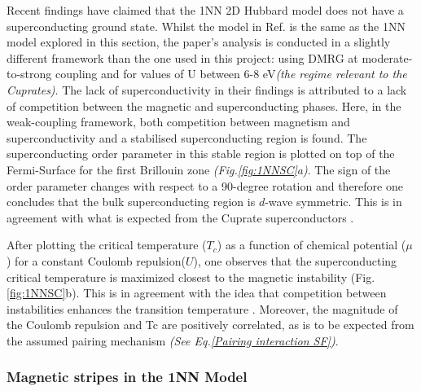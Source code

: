 \documentclass[11pt]{article}
\begin{document}
\noindent Recent findings have claimed that the 1NN 2D Hubbard model does not have a superconducting ground state\cite{qin2020absence}. 
Whilst the model in Ref. \cite{qin2020absence} is the same as the 1NN model explored in this section, the paper's analysis is conducted in a 
slightly different framework than the one used in this project: using DMRG \cite{white1992density} 
at moderate-to-strong coupling and for values of U between 6-8 eV\textit{(the 
regime relevant to the Cuprates)}.
The lack of superconductivity in their findings is attributed to a lack of competition 
between the magnetic and superconducting phases. Here, in the weak-coupling framework, both  competition between magnetism and superconductivity and 
a stabilised superconducting region is found. The superconducting order parameter in this stable region is plotted on top of the Fermi-Surface for the first Brillouin zone \textit{(Fig.\ref{fig:1NNSC}a)}.
The sign of the order parameter changes with respect to a 90-degree rotation and therefore one concludes that
the bulk superconducting region is $d$-wave symmetric. This is in agreement with what is expected from the Cuprate superconductors \cite{tsuei2000pairing}.\par
\medskip
\noindent 
After plotting the critical temperature ($T_c$) as a function of chemical potential ($\mu$) for a constant Coulomb repulsion($U$), one observes that
the superconducting critical temperature is maximized closest to the magnetic instability (Fig.\ref{fig:1NNSC}b).
This is in agreement with the idea that competition between instabilities
enhances the transition temperature \cite{maple1995interplay,sun2016dome}. Moreover, the magnitude of the Coulomb repulsion and Tc are positively correlated, as is to be expected from the assumed 
pairing mechanism \textit{(See Eq.\ref{Pairing interaction SF})}.





\subsubsection{Magnetic stripes in the 1NN Model}
\label{subsec:Stripes1NN}
\end{document}
